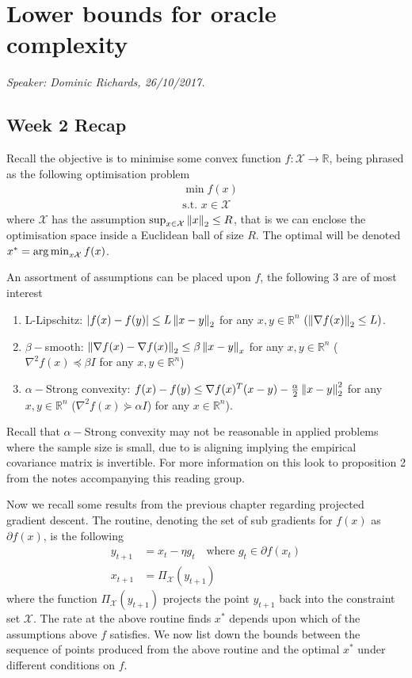 
\chapter{Lower bounds for oracle complexity}

\emph{Speaker: Dominic Richards, 26/10/2017.}\\

\section{Week 2 Recap}

Recall the objective is to minimise some convex function $f: \mathcal{X} \rightarrow \mathbb{R}$, being phrased as the following optimisation problem
\begin{align}
& \min f(x) \\
& \text{s.t. } x \in \mathcal{X}
\end{align}
where $\mathcal{X}$ has the assumption $\sup_{x \in \mathcal{X}} \left\lVert x\right\rVert_2 \leq R$, that is we can enclose the optimisation space inside a Euclidean ball of size $R$. The optimal will be denoted $x^{*} = \operatorname*{arg\,min}_{x  \mathcal{X}} f(x)$.

An assortment of assumptions can be placed upon $f$, the following 3 are of most interest
\begin{enumerate}
    \item{L-Lipschitz: $|f(x) - f(y)| \leq L \left\lVert x-y\right\rVert_2$ for any $x,y \in \mathbb{R}^n$ $(\left\lVert\nabla f(x)\right\rVert_2 \leq L)$.}
    \item{$\beta-$smooth: $\left\lVert\nabla f(x) - \nabla f(x)\right\rVert_2 \leq \beta\left\lVert x-y\right\rVert_x$ for any $x,y \in \mathbb{R}^n$ ($\nabla^2 f(x) \preccurlyeq \beta I$ for any $x,y \in \mathbb{R}^n$)}
    \item{$\alpha-$Strong convexity: $f(x) - f(y) \leq \nabla f(x)^T (x-y) - \frac{\alpha}{2} \left\lVert x-y\right\rVert_2^2$ for any $x,y \in \mathbb{R}^n$ ($\nabla^2 f(x)  \curlyeqsucc \alpha I$) for any $x \in \mathbb{R}^n$)}.
\end{enumerate}

Recall that $\alpha-$Strong convexity may not be reasonable in applied problems where the sample size is small, due to is aligning implying the empirical covariance matrix is invertible. For more information on this look  to proposition 2 from the notes accompanying this reading group.

Now we recall some results from the previous chapter regarding projected gradient descent. The routine, denoting the set of sub gradients for $f(x)$ as $\partial f(x)$, is the following
\begin{align}
y_{t+1} & = x_t - \eta g_t \quad \text{where } g_t \in \partial f(x_t) \\
x_{t+1} & = \Pi_{\mathcal{X}}(y_{t+1})
\label{equ:ProjGradDesc}
\end{align}
where the function $\Pi_{\mathcal{X}}(y_{t+1})$ projects the point $y_{t+1}$ back into the constraint set $\mathcal{X}$. The rate at the above routine finds $x^{*}$ depends upon which of the assumptions above $f$ satisfies. We now list down the bounds between the sequence of points produced from the above routine and the optimal $x^{*}$ under different conditions on $f$.

